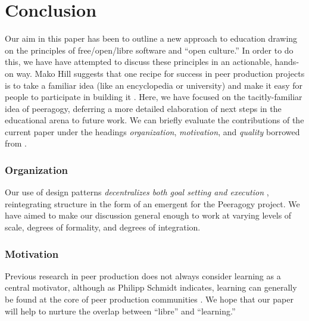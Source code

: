 \section{Conclusion}\label{sec:Conclusion}


Our aim in this paper has been to outline a new approach to education
drawing on the principles of free/open/libre software and ``open
culture.''  In order to do this, we have have attempted to discuss
these principles in an actionable, hands-on way.  Mako Hill suggests
that one recipe for success in peer production projects is to take a
familiar idea (like an encyclopedia or university) and make it easy
for people to participate in building it \cite{almost-wikipedia}.
Here, we have focused on the tacitly-familiar idea of peeragogy, deferring a
more detailed elaboration of next steps in the educational arena to
future work.  We can briefly evaluate the contributions of the current
paper under the headings \emph{organization}, \emph{motivation}, and
\emph{quality} borrowed from \cite{benkler2015peer}.

\vspace{-.25\baselineskip}

\subsubsection*{Organization} 
Our use of design patterns \emph{decentralizes both goal setting and
  execution} \cite{benkler2015peer}, reintegrating structure in the
form of an emergent  for the Peeragogy project.
We have aimed to make our discussion general enough to work at varying
levels of scale, degrees of formality, and degrees of integration.

\vspace{-.25\baselineskip}

\subsubsection*{Motivation}  Previous research in peer production does not always consider learning as
a central motivator, although as Philipp Schmidt indicates, learning can generally be found at the core of peer production communities \cite{schmidt+commons-based+2009}.  We hope that our paper will help to nurture the overlap between ``libre'' and ``learning.''

